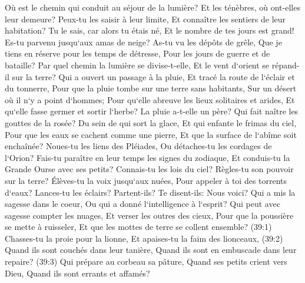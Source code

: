 \verse Où est le chemin qui conduit au séjour de la lumière? Et les ténèbres, où ont-elles leur demeure? 
\verse Peux-tu les saisir à leur limite, Et connaître les sentiers de leur habitation? 
\verse Tu le sais, car alors tu étais né, Et le nombre de tes jours est grand! 
\verse Es-tu parvenu jusqu`aux amas de neige? As-tu vu les dépôts de grêle, 
\verse Que je tiens en réserve pour les temps de détresse, Pour les jours de guerre et de bataille? 
\verse Par quel chemin la lumière se divise-t-elle, Et le vent d`orient se répand-il sur la terre? 
\verse Qui a ouvert un passage à la pluie, Et tracé la route de l`éclair et du tonnerre, 
\verse Pour que la pluie tombe sur une terre sans habitants, Sur un désert où il n`y a point d`hommes; 
\verse Pour qu`elle abreuve les lieux solitaires et arides, Et qu`elle fasse germer et sortir l`herbe? 
\verse La pluie a-t-elle un père? Qui fait naître les gouttes de la rosée? 
\verse Du sein de qui sort la glace, Et qui enfante le frimas du ciel, 
\verse Pour que les eaux se cachent comme une pierre, Et que la surface de l`abîme soit enchaînée? 
\verse Noues-tu les liens des Pléiades, Ou détaches-tu les cordages de l`Orion? 
\verse Fais-tu paraître en leur temps les signes du zodiaque, Et conduis-tu la Grande Ourse avec ses petits? 
\verse Connais-tu les lois du ciel? Règles-tu son pouvoir sur la terre? 
\verse Élèves-tu la voix jusqu`aux nuées, Pour appeler à toi des torrents d`eaux? 
\verse Lances-tu les éclairs? Partent-ils? Te disent-ils: Nous voici? 
\verse Qui a mis la sagesse dans le coeur, Ou qui a donné l`intelligence à l`esprit? 
\verse Qui peut avec sagesse compter les nuages, Et verser les outres des cieux, 
\verse Pour que la poussière se mette à ruisseler, Et que les mottes de terre se collent ensemble? 
\verse (39:1) Chasses-tu la proie pour la lionne, Et apaises-tu la faim des lionceaux, 
\verse (39:2) Quand ils sont couchés dans leur tanière, Quand ils sont en embuscade dans leur repaire? 
\verse (39:3) Qui prépare au corbeau sa pâture, Quand ses petits crient vers Dieu, Quand ils sont errants et affamés? 

